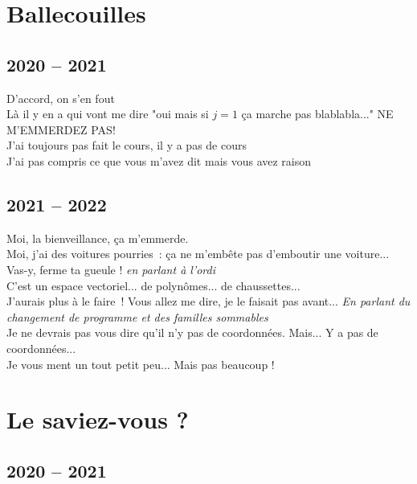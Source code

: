 \documentclass[french, a4paper, openany]{book}
\begin{document}
\chapter{Ballecouilles}

\section{2020 -- 2021}
 
	\noindent \og D'accord, on s'en fout \fg \\
	\og Là il y en a qui vont me dire "oui mais si $j = 1$ ça marche pas blablabla..." NE M'EMMERDEZ PAS! \fg \\
	\og J'ai toujours pas fait le cours, il y a pas de cours \fg \\
	\og J'ai pas compris ce que vous m'avez dit mais vous avez raison \fg \\

\section{2021 -- 2022}

	\noindent \og Moi, la bienveillance, ça m'emmerde. \fg \\
	\og Moi, j'ai des voitures pourries~: ça ne m'embête pas d'emboutir une voiture... \fg \\
	\og Vas-y, ferme ta gueule ! \fg \emph{en parlant à l'ordi} \\
	\og C'est un espace vectoriel... de polynômes... de chaussettes... \fg \\
	\og J'aurais plus à le faire~! Vous allez me dire, je le faisait pas avant... \fg \emph{En parlant du changement de programme et des familles sommables} \\
	\og Je ne devrais pas vous dire qu'il n'y pas de coordonnées. Mais... Y a pas de coordonnées... \fg \\
	\og Je vous ment un tout petit peu... Mais pas beaucoup ! \fg \\

\chapter{Le saviez-vous ?}

\section{2020 -- 2021}
\end{document}
